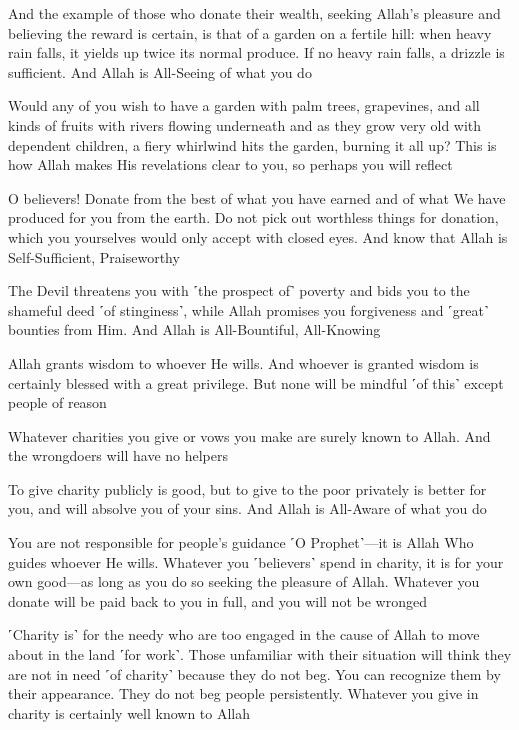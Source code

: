 And the example of those who donate their wealth, seeking Allah’s pleasure and believing the reward is certain, is that of a garden on a fertile hill: when heavy rain falls, it yields up twice its normal produce. If no heavy rain falls, a drizzle is sufficient. And Allah is All-Seeing of what you do

Would any of you wish to have a garden with palm trees, grapevines, and all kinds of fruits with rivers flowing underneath and as they grow very old with dependent children, a fiery whirlwind hits the garden, burning it all up? This is how Allah makes His revelations clear to you, so perhaps you will reflect

O believers! Donate from the best of what you have earned and of what We have produced for you from the earth. Do not pick out worthless things for donation, which you yourselves would only accept with closed eyes. And know that Allah is Self-Sufficient, Praiseworthy

The Devil threatens you with ˹the prospect of˺ poverty and bids you to the shameful deed ˹of stinginess˺, while Allah promises you forgiveness and ˹great˺ bounties from Him. And Allah is All-Bountiful, All-Knowing

Allah grants wisdom to whoever He wills. And whoever is granted wisdom is certainly blessed with a great privilege. But none will be mindful ˹of this˺ except people of reason

Whatever charities you give or vows you make are surely known to Allah. And the wrongdoers will have no helpers

To give charity publicly is good, but to give to the poor privately is better for you, and will absolve you of your sins. And Allah is All-Aware of what you do

You are not responsible for people’s guidance ˹O Prophet˺—it is Allah Who guides whoever He wills. Whatever you ˹believers˺ spend in charity, it is for your own good—as long as you do so seeking the pleasure of Allah. Whatever you donate will be paid back to you in full, and you will not be wronged

˹Charity is˺ for the needy who are too engaged in the cause of Allah to move about in the land ˹for work˺. Those unfamiliar with their situation will think they are not in need ˹of charity˺ because they do not beg. You can recognize them by their appearance. They do not beg people persistently. Whatever you give in charity is certainly well known to Allah


